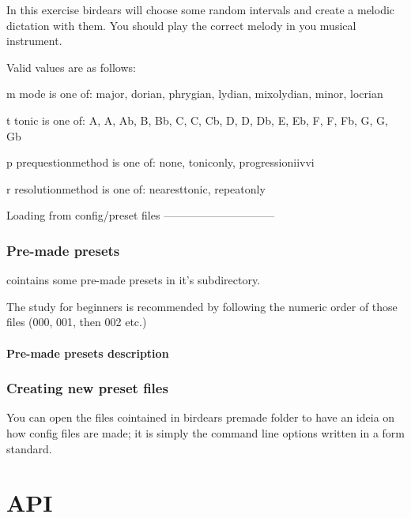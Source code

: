 \documentclass[letterpaper,10pt,english]{sphinxmanual}
\begin{document}
\begin{sphinxVerbatim}[commandchars=\\\{\}]
  In this exercise birdears will choose some random intervals and create a
  melodic dictation with them. You should play the correct melody in you
  musical instrument.

  Valid values are as follows:

  \PYGZhy{}m \PYGZlt{}mode\PYGZgt{} is one of: major, dorian, phrygian, lydian, mixolydian, minor,
  locrian

  \PYGZhy{}t \PYGZlt{}tonic\PYGZgt{} is one of: A, A\PYGZsh{}, Ab, B, Bb, C, C\PYGZsh{}, Cb, D, D\PYGZsh{}, Db, E, Eb, F,
  F\PYGZsh{}, Fb, G, G\PYGZsh{}, Gb

  \PYGZhy{}p \PYGZlt{}prequestion\PYGZus{}method\PYGZgt{} is one of: none, tonic\PYGZus{}only, progression\PYGZus{}i\PYGZus{}iv\PYGZus{}v\PYGZus{}i

  \PYGZhy{}r \PYGZlt{}resolution\PYGZus{}method\PYGZgt{} is one of: nearest\PYGZus{}tonic, repeat\PYGZus{}only
\end{sphinxVerbatim}

Loading from config/preset files
——————————\textendash{}


\subsection{Pre-made presets}
\label{\detokenize{index:pre-made-presets}}
 cointains some pre-made presets in it’s 
subdirectory.

The study for beginners is recommended by following the numeric order of
those files (000, 001, then 002 etc.)


\subsubsection{Pre-made presets description}
\label{\detokenize{index:pre-made-presets-description}}


\subsection{Creating new preset files}
\label{\detokenize{index:creating-new-preset-files}}
You can open the files cointained in birdears premade 
folder to have an ideia on how config files are made; it is simply the
command line options written in a form  standard.


\chapter{API}
\label{\detokenize{index:api}}
\end{document}
